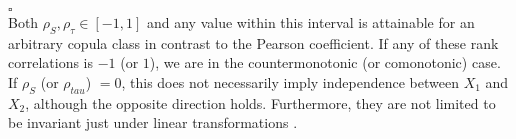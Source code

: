 \hfill $\square$ \\


Both $\rho_S, \rho_{\tau} \in [-1,1]$ and any value within this interval is attainable for an arbitrary copula class in contrast to the Pearson coefficient. 
If any of these rank correlations is $-1$ (or $1$), we are in the countermonotonic (or comonotonic) case. If $\rho_S$ (or $\rho_{tau}$) $=0$, this does not necessarily imply independence between $X_1$ and $X_2$, although the opposite direction holds.
Furthermore, they are not limited to be invariant just under linear transformations . 










